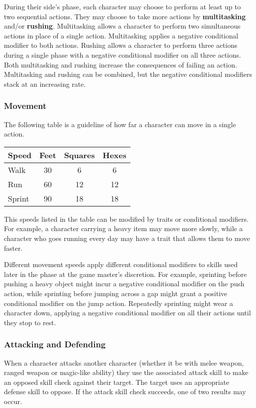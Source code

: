 \documentclass[11pt]{article}
\begin{document}
During their side's phase, each character may choose to perform at least up to two sequential actions.
They may choose to take more actions by \textbf{multitasking} and/or \textbf{rushing}.
Multitasking allows a character to perform two simultaneous actions in place of a single action.
Multitasking applies a negative conditional modifier to both actions.
Rushing allows a character to perform three actions during a single phase with a negative conditional modifier on all three actions.
Both multitasking and rushing increase the consequences of failing an action.
Multitasking and rushing can be combined, but the negative conditional modifiers stack at an increasing rate.

\subsubsection{Movement}
The following table is a guideline of how far a character can move in a single action.

\begin{center}
	\begin{tabular}{lccc}
		Speed  & Feet & Squares & Hexes \\
		\hline
		Walk   & 30   & 6       & 6     \\
		Run    & 60   & 12      & 12    \\
		Sprint & 90   & 18      & 18    \\
	\end{tabular}
\end{center}

This speeds listed in the table can be modified by traits or conditional modifiers.
For example, a character carrying a heavy item may move more slowly, while a character who goes running every day may have a trait that allows them to move faster.

Different movement speeds apply different conditional modifiers to skills used later in the phase at the game master's discretion.
For example, sprinting before pushing a heavy object might incur a negative conditional modifier on the push action, while sprinting before jumping across a gap might grant a positive conditional modifier on the jump action.
Repeatedly sprinting might wear a character down, applying a negative conditional modifier on all their actions until they stop to rest.

\subsubsection{Attacking and Defending}
When a character attacks another character (whether it be with melee weapon, ranged weapon or magic-like ability) they use the associated attack skill to make an opposed skill check against their target.
The target uses an appropriate defense skill to oppose.
If the attack skill check succeeds, one of two results may occur.
\end{document}
